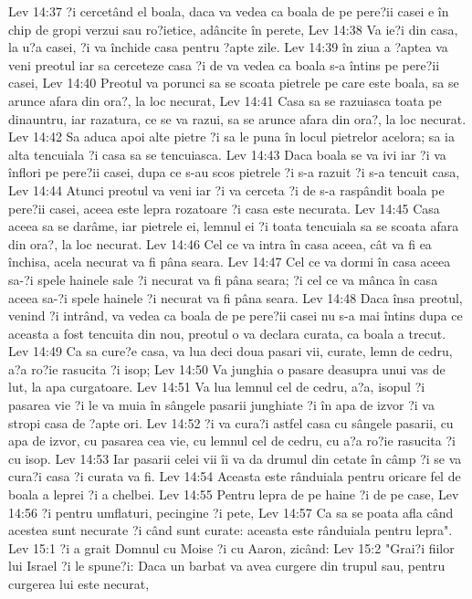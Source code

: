 Lev 14:37  ?i cercetând el boala, daca va vedea ca boala de pe pere?ii casei e în chip de gropi verzui sau ro?ietice, adâncite în perete,
Lev 14:38  Va ie?i din casa, la u?a casei, ?i va închide casa pentru ?apte zile.
Lev 14:39  în ziua a ?aptea va veni preotul iar sa cerceteze casa ?i de va vedea ca boala s-a întins pe pere?ii casei,
Lev 14:40  Preotul va porunci sa se scoata pietrele pe care este boala, sa se arunce afara din ora?, la loc necurat,
Lev 14:41  Casa sa se razuiasca toata pe dinauntru, iar razatura, ce se va razui, sa se arunce afara din ora?, la loc necurat.
Lev 14:42  Sa aduca apoi alte pietre ?i sa le puna în locul pietrelor acelora; sa ia alta tencuiala ?i casa sa se tencuiasca.
Lev 14:43  Daca boala se va ivi iar ?i va înflori pe pere?ii casei, dupa ce s-au scos pietrele ?i s-a razuit ?i s-a tencuit casa,
Lev 14:44  Atunci preotul va veni iar ?i va cerceta ?i de s-a raspândit boala pe pere?ii casei, aceea este lepra rozatoare ?i casa este necurata.
Lev 14:45  Casa aceea sa se darâme, iar pietrele ei, lemnul ei ?i toata tencuiala sa se scoata afara din ora?, la loc necurat.
Lev 14:46  Cel ce va intra în casa aceea, cât va fi ea închisa, acela necurat va fi pâna seara.
Lev 14:47  Cel ce va dormi în casa aceea sa-?i spele hainele sale ?i necurat va fi pâna seara; ?i cel ce va mânca în casa aceea sa-?i spele hainele ?i necurat va fi pâna seara.
Lev 14:48  Daca însa preotul, venind ?i intrând, va vedea ca boala de pe pere?ii casei nu s-a mai întins dupa ce aceasta a fost tencuita din nou, preotul o va declara curata, ca boala a trecut.
Lev 14:49  Ca sa cure?e casa, va lua deci doua pasari vii, curate, lemn de cedru, a?a ro?ie rasucita ?i isop;
Lev 14:50  Va junghia o pasare deasupra unui vas de lut, la apa curgatoare.
Lev 14:51  Va lua lemnul cel de cedru, a?a, isopul ?i pasarea vie ?i le va muia în sângele pasarii junghiate ?i în apa de izvor ?i va stropi casa de ?apte ori.
Lev 14:52  ?i va cura?i astfel casa cu sângele pasarii, cu apa de izvor, cu pasarea cea vie, cu lemnul cel de cedru, cu a?a ro?ie rasucita ?i cu isop.
Lev 14:53  Iar pasarii celei vii îi va da drumul din cetate în câmp ?i se va cura?i casa ?i curata va fi.
Lev 14:54  Aceasta este rânduiala pentru oricare fel de boala a leprei ?i a chelbei.
Lev 14:55  Pentru lepra de pe haine ?i de pe case,
Lev 14:56  ?i pentru umflaturi, pecingine ?i pete,
Lev 14:57  Ca sa se poata afla când acestea sunt necurate ?i când sunt curate: aceasta este rânduiala pentru lepra".
Lev 15:1  ?i a grait Domnul cu Moise ?i cu Aaron, zicând:
Lev 15:2  "Grai?i fiilor lui Israel ?i le spune?i: Daca un barbat va avea curgere din trupul sau, pentru curgerea lui este necurat,

